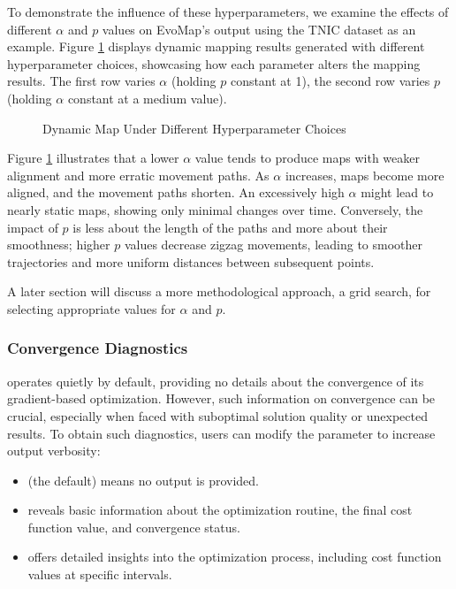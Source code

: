 \documentclass[article]{jss}
\begin{document}
To demonstrate the influence of these hyperparameters, we examine the effects of different $\alpha$ and $p$ 
values on EvoMap's output using the TNIC dataset as an example. Figure \ref{fig:hyperparameters} displays 
dynamic mapping results generated with different hyperparameter choices, showcasing how each parameter alters the mapping 
results. The first row varies $\alpha$ (holding $p$ constant at 1), the second row varies $p$ (holding $\alpha$ constant
at a medium value).

\begin{figure}[hbt!]
  \centering
  \caption{\label{fig:hyperparameters} Dynamic Map Under Different Hyperparameter Choices}
\end{figure}
  
Figure \ref{fig:hyperparameters} illustrates that a lower $\alpha$ value tends to produce maps with weaker alignment 
and more erratic movement paths. As $\alpha$ increases, maps become more aligned, and the movement paths shorten. 
An excessively high $\alpha$ might lead to nearly static maps, showing only minimal changes over time. 
Conversely, the impact of $p$ is less about the length of the paths and more about their smoothness; higher $p$ values 
decrease zigzag movements, leading to smoother trajectories and more uniform distances between subsequent points.

A later section will discuss a more methodological approach, a grid search, for selecting appropriate 
values for $\alpha$ and $p$.

\subsubsection{Convergence Diagnostics}

 operates quietly by default, providing no details about the convergence
of its gradient-based optimization. However, such information on convergence can be crucial, 
especially when faced with suboptimal solution quality or unexpected results. 
To obtain such diagnostics, users can modify the  parameter to increase output verbosity: 
\begin{itemize}
  \item {} (the default) means no output is provided.
  \item {} reveals basic information about the optimization routine, the final cost function value, and %
  convergence status.
  \item {} offers detailed insights into the optimization process, including cost function values at %
  specific intervals.  
\end{itemize}
\end{document}
